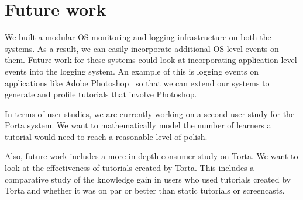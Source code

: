 \chapter{Future work}
We built a modular OS monitoring and logging infrastructure on both the systems. As a result, we can easily incorporate additional OS level events on them. Future work for these systems could look at incorporating application level events into the logging system. An example of this is logging events on applications like Adobe Photoshop~\cite{Photoshop} so that we can extend our systems to generate and profile tutorials that involve Photoshop.

In terms of user studies, we are currently working on a second user study for the Porta system. We want to mathematically model the number of learners a tutorial would need to reach a reasonable level of polish.

Also, future work includes a more in-depth consumer study on Torta. We want to look at the effectiveness of tutorials created by Torta. This includes a comparative study of the knowledge gain in users who used tutorials created by Torta and whether it was on par or better than static tutorials or screencasts.
